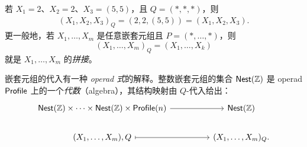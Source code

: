 \begin{example}\label{exampleofmultiplesubstitution1}
    若 $X_1 = 2$、$X_2 = 2$、$X_3 = (5,5)$，且 $Q = (*,*,*)$，则
    \begin{align*}
        (X_1,X_2,X_3)_Q = (2,2,(5,5)) = (X_1,X_2,X_3).
    \end{align*}
    更一般地，若 $X_1,\dots,X_m$ 是任意嵌套元组且 $P = (* , \dots , *)$，则
    \[
    (X_1,\dots,X_m)_Q = (X_1,\dots,X_k)
    \]
    就是 $X_1,\dots,X_m$ 的{\it 拼接}。
\end{example}

\begin{aside}
    嵌套元组的代入有一种 {\it operad 式}的解释。整数嵌套元组的集合 $\mathsf{Nest}(\mathbb{Z})$ 是 operad $\mathsf{Profile}$ 上的一个{\it 代数}（algebra），其结构映射由 $Q$-代入给出：
    \[ \begin{tikzcd} 
    \mathterm{Nest}(\mathbb{Z})\times \dots \times \mathterm{Nest}(\mathbb{Z})\times \mathterm{Profile}(n) \ar[rr] & & \mathterm{Nest}(\mathbb{Z})\\
    (X_1,\dots,X_m),Q \ar[rr,mapsto] & & (X_1,\dots,X_m)_Q.
    \end{tikzcd}\]
\end{aside}





